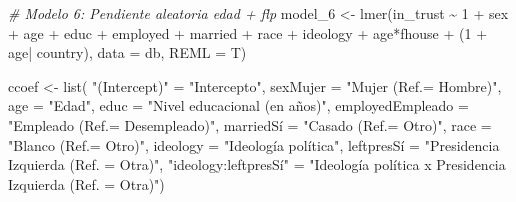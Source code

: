 \documentclass[
  12pt,
  a4paper,
]{article}
\newenvironment{Shaded}{\begin{snugshade}}{\end{snugshade}}
\newcommand{\AttributeTok}[1]{\textcolor[rgb]{0.77,0.63,0.00}{#1}}
\newcommand{\CommentTok}[1]{\textcolor[rgb]{0.56,0.35,0.01}{\textit{#1}}}
\newcommand{\DecValTok}[1]{\textcolor[rgb]{0.00,0.00,0.81}{#1}}
\newcommand{\FunctionTok}[1]{\textcolor[rgb]{0.00,0.00,0.00}{#1}}
\newcommand{\NormalTok}[1]{#1}
\newcommand{\OtherTok}[1]{\textcolor[rgb]{0.56,0.35,0.01}{#1}}
\newcommand{\SpecialCharTok}[1]{\textcolor[rgb]{0.00,0.00,0.00}{#1}}
\newcommand{\StringTok}[1]{\textcolor[rgb]{0.31,0.60,0.02}{#1}}
\begin{document}
\begin{Shaded}
\begin{Highlighting}[]
\CommentTok{\# Modelo 6: Pendiente aleatoria edad + flp}
\NormalTok{model\_6 }\OtherTok{\textless{}{-}} \FunctionTok{lmer}\NormalTok{(in\_trust }\SpecialCharTok{\textasciitilde{}} \DecValTok{1} \SpecialCharTok{+}\NormalTok{ sex }\SpecialCharTok{+}\NormalTok{ age }\SpecialCharTok{+}\NormalTok{ educ }\SpecialCharTok{+}\NormalTok{ employed }\SpecialCharTok{+}\NormalTok{ married }\SpecialCharTok{+}
\NormalTok{                race }\SpecialCharTok{+}\NormalTok{ ideology }\SpecialCharTok{+}\NormalTok{ age}\SpecialCharTok{*}\NormalTok{fhouse }\SpecialCharTok{+}\NormalTok{ (}\DecValTok{1} \SpecialCharTok{+}\NormalTok{ age}\SpecialCharTok{|}\NormalTok{ country),}
                \AttributeTok{data =}\NormalTok{ db, }
                \AttributeTok{REML =}\NormalTok{ T)}


\NormalTok{ccoef }\OtherTok{\textless{}{-}} \FunctionTok{list}\NormalTok{(}
  \StringTok{"(Intercept)"} \OtherTok{=} \StringTok{"Intercepto"}\NormalTok{,}
  \AttributeTok{sexMujer =} \StringTok{"Mujer (Ref.= Hombre)"}\NormalTok{,}
  \AttributeTok{age =} \StringTok{"Edad"}\NormalTok{,}
  \AttributeTok{educ =} \StringTok{"Nivel educacional (en años)"}\NormalTok{,}
  \AttributeTok{employedEmpleado =} \StringTok{"Empleado (Ref.= Desempleado)"}\NormalTok{,}
\NormalTok{  marriedSí }\OtherTok{=} \StringTok{"Casado (Ref.= Otro)"}\NormalTok{,}
  \AttributeTok{race =} \StringTok{"Blanco (Ref.= Otro)"}\NormalTok{,}
  \AttributeTok{ideology =} \StringTok{"Ideología política"}\NormalTok{,}
\NormalTok{  leftpresSí }\OtherTok{=} \StringTok{"Presidencia Izquierda (Ref. = Otra)"}\NormalTok{,}
  \StringTok{"ideology:leftpresSí"} \OtherTok{=} \StringTok{"Ideología política x Presidencia Izquierda (Ref. = Otra)"}\NormalTok{)}



\end{Highlighting}
\end{Shaded}
\end{document}
